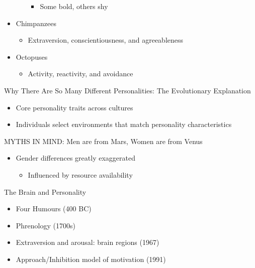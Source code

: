 \documentclass[
]{book}
\providecommand{\tightlist}{%
  \setlength{\itemsep}{0pt}\setlength{\parskip}{0pt}}
\begin{document}
\begin{reflect}
\begin{itemize}
\begin{itemize}
    \begin{itemize}
    \tightlist
    \item
      Some bold, others shy\\
    \end{itemize}
  \end{itemize}
\item
  Chimpanzees

  \begin{itemize}
  \tightlist
  \item
    Extraversion, conscientiousness, and agreeableness\\
  \end{itemize}
\item
  Octopuses

  \begin{itemize}
  \tightlist
  \item
    Activity, reactivity, and avoidance
  \end{itemize}
\end{itemize}

Why There Are So Many Different Personalities: The Evolutionary Explanation

\begin{itemize}
\tightlist
\item
  Core personality traits across cultures\\
\item
  Individuals select environments that match personality characteristics
\end{itemize}

MYTHS IN MIND: Men are from Mars, Women are from Venus

\begin{itemize}
\tightlist
\item
  Gender differences greatly exaggerated

  \begin{itemize}
  \tightlist
  \item
    Influenced by resource availability
  \end{itemize}
\end{itemize}

The Brain and Personality

\begin{itemize}
\tightlist
\item
  Four Humours (400 BC)
\item
  Phrenology (1700s)
\item
  Extraversion and arousal: brain regions (1967)
\item
  Approach/Inhibition model of motivation (1991)
\end{itemize}


\end{reflect}
\end{document}
